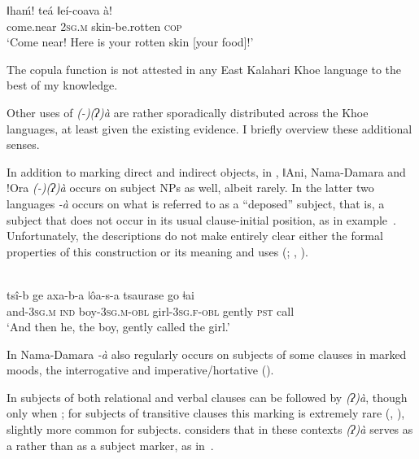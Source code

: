 \documentclass[output=paper]{LSP/langsci}
\begin{document}
\ex\label{09-mc-ex:10} 
\gll ǁhaḿ! teá ǁeí-coava à! \\
come.near 2\textsc{sg.m} skin-be.rotten \textsc{cop}\\
\glt ‘Come near! Here is your rotten skin [\ie your food]!’
\z
\z

The copula function is not attested in any East Kalahari Khoe language to the best of my knowledge.

Other uses of \textit{(-)(ʔ)à} are rather sporadically distributed across the Khoe languages, at least given the existing evidence. I briefly overview these additional senses.

In addition to marking direct and indirect objects, in , ǁAni, Nama-Damara and !Ora \textit{(-)(ʔ)à} occurs on subject NPs as well, albeit rarely. In the latter two languages \textit{-à} occurs on what is referred to as a “deposed” subject, that is, a subject that does not occur in its usual clause-initial position, as in example~. Unfortunately, the descriptions do not make entirely clear either the formal properties of this construction or its meaning and uses (\citealt[203]{Hagman1973Nama}; \citealt[341]{Haacke2013Gora}, \citeyear[328]{Haacke2013Namibian}).

\begin{exe}
\ex\label{09-mc-ex:11} 
\\
\gll tsî-b ge axa-b-a ǀôa-s-a tsaurase go ǂai\\
and-3\textsc{sg.m} \textsc{ind} boy-3\textsc{sg.m}-\textsc{obl} girl-3\textsc{sg.f}-\textsc{obl} gently \textsc{pst} call\\
\glt ‘And then he, the boy, gently called the girl.’ 
\end{exe}

In Nama-Damara \textit{-à} also regularly occurs on subjects of some clauses in marked moods, the interrogative and imperative/hortative (\citealt[260, 270–271]{Hagman1973Nama}).

In  subjects of both relational and verbal clauses can be followed by \textit{(ʔ)à}, though only when ; for subjects of transitive clauses this marking is extremely rare (\citealt[51–52]{Kilian-Hatz2008Grammar}, \citeyear[369–371]{Kilian-Hatz2013Kxoe}), slightly more common for  subjects. \citet[370]{Kilian-Hatz2013Kxoe} considers that in these contexts \textit{(ʔ)à} serves as a  rather than as a subject marker, as in~.
\end{document}
